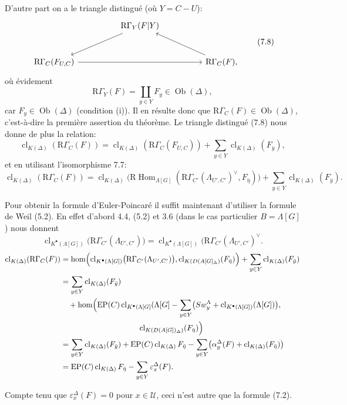 \documentclass[11pt]{article}
\DeclareMathOperator{\Hom}{Hom}
\providecommand{\cl}{\operatorname{cl}}
\providecommand{\EP}{\operatorname{EP}}
\providecommand{\Hom}{\operatorname{Hom}}
\providecommand{\cl}{\operatorname{cl}}
\providecommand{\EP}{\operatorname{EP}}
\providecommand{\clK}[1]{\operatorname{cl}_{K(#1)}}
\providecommand{\clKstar}[1]{\operatorname{cl}_{K^{\bullet}(#1)}}
\providecommand{\Hom}{\operatorname{Hom}}
\providecommand{\cl}{\operatorname{cl}}
\begin{document}
D'autre part on a le triangle distingué (où $Y=C-U$):
\[
\begin{tikzcd}[column sep=huge,row sep=large]
& \mathrm{R}\Gamma_Y(F|Y) \arrow[dl] & \\
\mathrm{R}\Gamma_C(F_{U,C}) \arrow[rr] && \mathrm{R}\Gamma_C(F), \arrow[ul]
\end{tikzcd}
\tag{7.8}
\]
où évidement
\[
\mathrm{R}\Gamma_Y(F)=\coprod_{y\in Y}F_y\in\operatorname{Ob}(\Delta),
\]
car $F_y\in\operatorname{Ob}(\Delta)$ (condition (i)). Il en résulte donc que $\mathrm{R}\Gamma_C(F)\in\operatorname{Ob}(\Delta)$, c'est-à-dire la première assertion du théorème. Le triangle distingué (7.8) nous donne de plus la relation:
\[
\clK{\Delta}(\mathrm{R}\Gamma_C(F))
=
\clK{\Delta}(\mathrm{R}\Gamma_C(F_{U,C}))
+\sum_{y\in Y}\clK{\Delta}(F_{\bar y}),
\]
et en utilisant l'isomorphisme 7.7:
\[
\clK{\Delta}(\mathrm{R}\Gamma_C(F))
=
\clK{\Delta}\bigl(\mathrm{R}\Hom_{\Lambda[G]}(\mathrm{R}\Gamma_{C'}(\Lambda_{U',C'})^\vee,F_{\bar\eta})\bigr)
+\sum_{y\in Y}\clK{\Delta}(F_{\bar y}).
\]

Pour obtenir la formule d'Euler-Poincaré il suffit maintenant d'utiliser la formule de Weil (5.2). En effet d'abord 4.4, (5.2) et 3.6 (dans le cas particulier $B=\Lambda[G]$) nous donnent
\[
\clKstar{\Lambda[G]}\bigl(\mathrm{R}\Gamma_{C'}(\Lambda_{U',C'})\bigr)
=
\clKstar{\Lambda[G]}\bigl(\mathrm{R}\Gamma_{C'}(\Lambda_{U',C'})^\vee.
\]
\[
\begin{aligned}
\clK{\Delta}(\mathrm{R}\Gamma_C(F))
&=\operatorname{hom}\Bigl(
\clKstar{\Lambda[G]}\bigl(\mathrm{R}\Gamma_{C'}(\Lambda_{U',C'})\bigr),
\cl_{K(D(A[G]_\Delta)}(F_{\bar\eta})\Bigr)
 +\sum_{y\in Y}\clK{\Delta}(F_{\bar y})\\
&=\sum_{y\in Y}\clK{\Delta}(F_{\bar y})\\
&\quad +\operatorname{hom}\Bigl(
\EP(C)\operatorname{cl}_{K^{\bullet}(\Lambda[G]}(\Lambda[G]
 -\sum_{y\in Y}\bigl(Sw_y^{\Lambda}+\clKstar{\Lambda[G]}(\Lambda[G])\bigr),\\
&\hspace{10em}\cl_{K(D(A[G])_\Delta)}(F_{\bar\eta})\Bigr)\\
&=\sum_{y\in Y}\clK{\Delta}(F_{\bar y})
 +\EP(C)\clK{\Delta}F_{\bar\eta}
 -\sum_{y\in Y}\bigl(\alpha_y^\Delta(F)+\clK{\Delta}(F_{\bar\eta})\bigr)\\
&=\EP(C)\clK{\Delta}F_{\bar\eta}
 -\sum_{y\in Y}\varepsilon_x^\Delta(F).
\end{aligned}
\]

Compte tenu que $\varepsilon_x^\Delta(F)=0$ pour $x\in\mathcal U$, ceci n'est autre que la formule (7.2).
\end{document}
